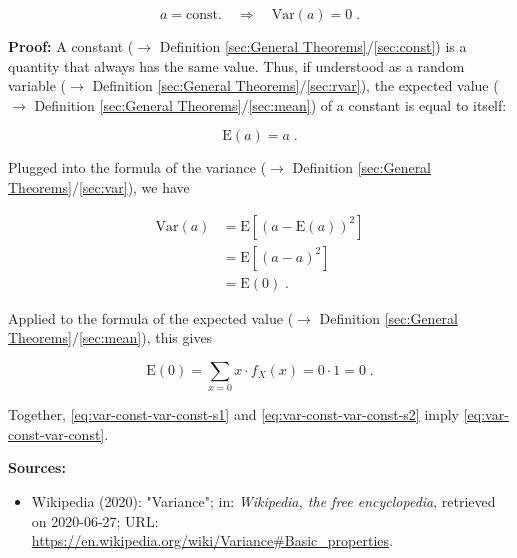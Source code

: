 \documentclass[a4paper,12pt,twoside]{book}
\begin{document}
\begin{equation} \label{eq:var-const-var-const}
a = \text{const.} \quad \Rightarrow \quad \mathrm{Var}(a) = 0 \; .
\end{equation}


\vspace{1em}
\textbf{Proof:} A constant ($\rightarrow$ Definition \ref{sec:General Theorems}/\ref{sec:const}) is a quantity that always has the same value. Thus, if understood as a random variable ($\rightarrow$ Definition \ref{sec:General Theorems}/\ref{sec:rvar}), the expected value ($\rightarrow$ Definition \ref{sec:General Theorems}/\ref{sec:mean}) of a constant is equal to itself:

\begin{equation} \label{eq:var-const-mean-const}
\mathrm{E}(a) = a \; .
\end{equation}

Plugged into the formula of the variance ($\rightarrow$ Definition \ref{sec:General Theorems}/\ref{sec:var}), we have

\begin{equation} \label{eq:var-const-var-const-s1}
\begin{split}
\mathrm{Var}(a) &= \mathrm{E}\left[ (a-\mathrm{E}(a))^2 \right] \\
&= \mathrm{E}\left[ (a-a)^2 \right] \\
&= \mathrm{E}(0) \; .
\end{split}
\end{equation}

Applied to the formula of the expected value ($\rightarrow$ Definition \ref{sec:General Theorems}/\ref{sec:mean}), this gives

\begin{equation} \label{eq:var-const-var-const-s2}
\mathrm{E}(0) = \sum_{x=0} x \cdot f_X(x) = 0 \cdot 1 = 0 \; .
\end{equation}

Together, \eqref{eq:var-const-var-const-s1} and \eqref{eq:var-const-var-const-s2} imply \eqref{eq:var-const-var-const}.



\vspace{1em}
\textbf{Sources:}
\begin{itemize}
\item Wikipedia (2020): "Variance"; in: \textit{Wikipedia, the free encyclopedia}, retrieved on 2020-06-27; URL: \url{https://en.wikipedia.org/wiki/Variance#Basic_properties}.
\end{itemize}
\end{document}

